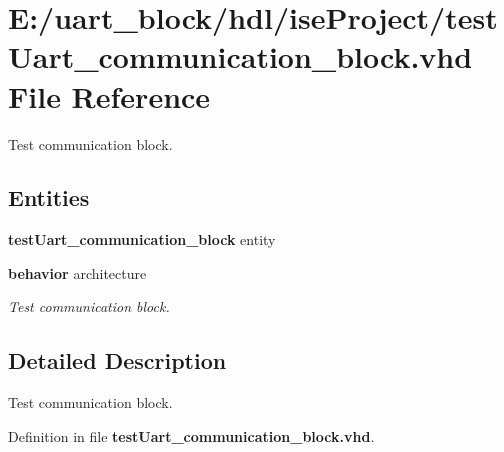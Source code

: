\section{E\-:/uart\-\_\-block/hdl/ise\-Project/test\-Uart\-\_\-communication\-\_\-block.vhd File Reference}
\label{test_uart__communication__block_8vhd}


Test communication block.  


\subsection*{Entities}
\begin{DoxyCompactItemize}
\item 
{\bf test\-Uart\-\_\-communication\-\_\-block} entity
\item 
{\bf behavior} architecture
\begin{DoxyCompactList}\small\item\em Test communication block. \end{DoxyCompactList}\end{DoxyCompactItemize}


\subsection{Detailed Description}
Test communication block. 

Definition in file {\bf test\-Uart\-\_\-communication\-\_\-block.\-vhd}.

